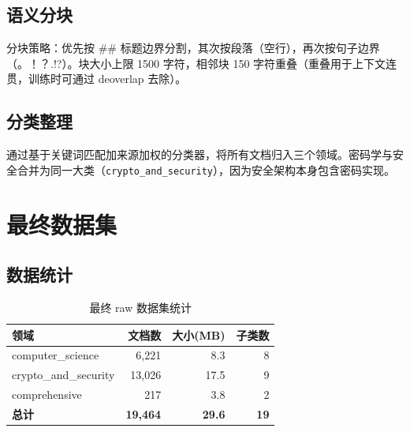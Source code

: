 \documentclass[12pt,a4paper]{ctexart}
\begin{document}
\subsection{语义分块}

分块策略：优先按 \#\# 标题边界分割，其次按段落（空行），再次按句子边界（。！？.!?）。块大小上限 1500 字符，相邻块 150 字符重叠（重叠用于上下文连贯，训练时可通过 deoverlap 去除）。

\subsection{分类整理}

通过基于关键词匹配加来源加权的分类器，将所有文档归入三个领域。密码学与安全合并为同一大类（\texttt{crypto\_and\_security}），因为安全架构本身包含密码实现。

\section{最终数据集}

\subsection{数据统计}

\begin{table}[htbp]
\centering
\caption{最终 raw 数据集统计}
\label{tab:final}
\begin{tabular}{@{}lrrr@{}}
\toprule
\textbf{领域} & \textbf{文档数} & \textbf{大小(MB)} & \textbf{子类数} \\
\midrule
computer\_science   & 6,221 & 8.3  & 8 \\
crypto\_and\_security & 13,026 & 17.5 & 9 \\
comprehensive       & 217   & 3.8  & 2 \\
\midrule
\textbf{总计}       & \textbf{19,464} & \textbf{29.6} & \textbf{19} \\
\bottomrule
\end{tabular}
\end{table}
\end{document}
